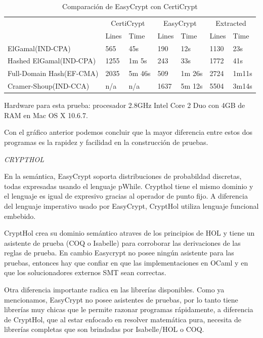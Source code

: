 \documentclass[runningheads,a4paper]{llncs}
\begin{document}
\begin{table}
  \caption{Comparación de EasyCrypt con CertiCrypt}
  \label{tab:simple1}
  \centering
  \begin{tabular}{ |p{3.5cm}|p{1.5cm}|p{1.5cm}|p{1.5cm}|p{1.5cm}|p{1.5cm}|p{1.5cm}|  }
 \hline
 & \multicolumn{2}{|c|}{CertiCrypt} & \multicolumn{2}{|c|}{EasyCrypt} & \multicolumn{2}{|c|}{Extracted} \\\cline{2-7}

 &Lines&Time&Lines&Time&Lines&Time\\\cline{2-7}
 \hline
 ElGamal(IND-CPA) & 565 & 45s & 190 & 12s & 1130 & 23s\\
 Hashed ElGamal(IND-CPA) & 1255  & 1m 5s & 243  & 33s & 1772 & 41s\\
 Full-Domain Hash(EF-CMA) & 2035 & 5m 46s&  509 & 1m 26s & 2724 & 1m11s\\
 Cramer-Shoup(IND-CCA) & n/a & n/a & 1637 & 5m 12s & 5504 & 3m14s\\
 \hline
\end{tabular}
\end{table}

Hardware para esta prueba: procesador 2.8GHz Intel Core 2 Duo con 4GB de RAM en Mac OS X 10.6.7.\cite{article3}

Con el gráfico anterior podemos concluir que la mayor diferencia entre estos dos programas es la rapidez y facilidad en la construcción de pruebas.

\centerline{\emph{CRYPTHOL}}

En la semántica, EasyCrypt soporta distribuciones de probabildad discretas, todas expresadas usando el lenguaje pWhile. Crypthol tiene el mismo dominio y el lenguaje es igual de expresivo gracias al operador de punto fijo. A diferencia del lenguaje imperativo usado por EasyCrypt, CryptHol utiliza lenguaje funcional embebido.

CryptHol crea su dominio semántico atraves de los principios de HOL y tiene un asistente de prueba (COQ o Isabelle) para corroborar las derivaciones de las reglas de prueba. En cambio Easycrypt no posee ningún asistente para las pruebas, entonces hay que confiar en que las implementaciones en OCaml y en que los solucionadores externos SMT sean correctas.

Otra diferencia importante radica en las librerías disponibles. Como ya mencionamos, EasyCrypt no posee asistentes de pruebas, por lo tanto tiene librerías muy chicas que le permite razonar programas rápidamente, a diferencia de CryptHol, que al estar enfocado en resolver matemática pura, necesita de librerías completas que son brindadas por Isabelle/HOL o COQ.
\end{document}
